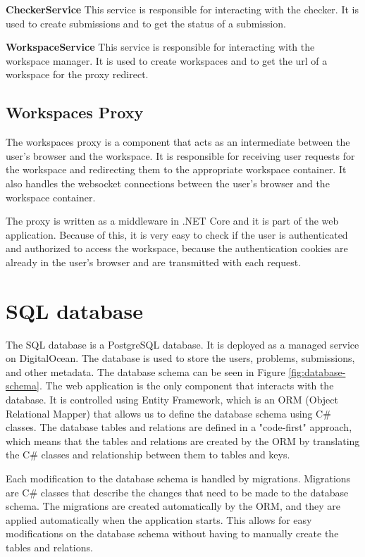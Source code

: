 \documentclass[12pt,a4paper]{report}
\begin{document}
\textbf{CheckerService}
This service is responsible for interacting with the checker. It is used to create submissions and to get the status of a submission.

\textbf{WorkspaceService}
This service is responsible for interacting with the workspace manager. It is used to create workspaces and to get the url of a workspace for the proxy redirect.

\subsection{Workspaces Proxy} \label{workspaces-proxy}
The workspaces proxy is a component that acts as an intermediate between the user's browser and the workspace. It is responsible for receiving user requests for the workspace and redirecting them to the appropriate workspace container. It also handles the websocket connections between the user's browser and the workspace container.

The proxy is written as a middleware in .NET Core and it is part of the web application. Because of this, it is very easy to check if the user is authenticated and authorized to access the workspace, because the authentication cookies are already in the user's browser and are transmitted with each request. 

\section{SQL database}
The SQL database is a PostgreSQL database. It is deployed as a managed service on DigitalOcean. The database is used to store the users, problems, submissions, and other metadata. The database schema can be seen in Figure \ref{fig:database-schema}. The web application is the only component that interacts with the database. It is controlled using Entity Framework, which is an ORM (Object Relational Mapper) that allows us to define the database schema using C\# classes. The database tables and relations are defined in a "code-first" approach, which means that the tables and relations are created by the ORM by translating the C\# classes and relationship between them to tables and keys.

Each modification to the database schema is handled by migrations. Migrations are C\# classes that describe the changes that need to be made to the database schema. The migrations are created automatically by the ORM, and they are applied automatically when the application starts. This allows for easy modifications on the database schema without having to manually create the tables and relations.
\end{document}

